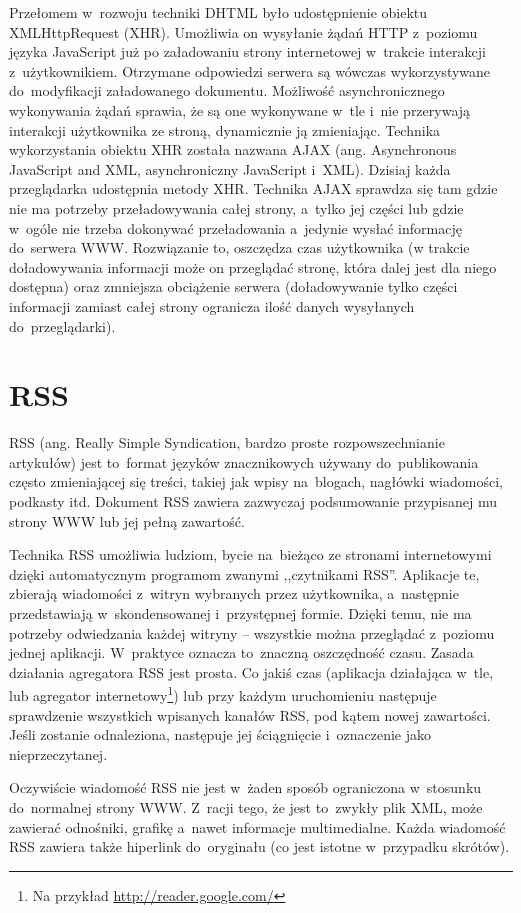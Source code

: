 \documentclass[a4paper,12pt,oneside]{report}
\begin{document}
Przełomem w~rozwoju techniki DHTML było udostępnienie obiektu XMLHttpRequest (XHR). Umożliwia on wysyłanie żądań HTTP z~poziomu języka JavaScript już po załadowaniu strony internetowej w~trakcie interakcji z~użytkownikiem. Otrzymane odpowiedzi serwera są wówczas wykorzystywane do~modyfikacji załadowanego dokumentu. Możliwość asynchronicznego wykonywania żądań sprawia, że są one wykonywane w~tle i~nie przerywają interakcji użytkownika ze stroną, dynamicznie ją zmieniając. Technika wykorzystania obiektu XHR została nazwana AJAX (ang. Asynchronous JavaScript and XML, asynchroniczny JavaScript i~XML). Dzisiaj każda przeglądarka udostępnia metody XHR. Technika AJAX sprawdza się tam gdzie nie ma potrzeby przeładowywania całej strony, a~tylko jej części lub gdzie w~ogóle nie trzeba dokonywać przeładowania a~jedynie wysłać informację do~serwera WWW. Rozwiązanie to, oszczędza czas użytkownika (w trakcie doładowywania informacji może on przeglądać stronę, która dalej jest dla niego dostępna) oraz zmniejsza obciążenie serwera (doładowywanie tylko części informacji zamiast całej strony ogranicza ilość danych wysyłanych do~przeglądarki). 

\section{RSS}
\label{sec:rss}
RSS (ang. Really Simple Syndication, bardzo proste rozpowszechnianie artykułów) jest to~format języków znacznikowych używany do~publikowania często zmieniającej się treści, takiej jak wpisy na~blogach, nagłówki wiadomości, podkasty itd. Dokument RSS zawiera zazwyczaj podsumowanie przypisanej mu strony WWW lub jej pełną zawartość. 

Technika RSS umożliwia ludziom, bycie na~bieżąco ze stronami internetowymi dzięki automatycznym programom zwanymi ,,czytnikami RSS''. Aplikacje te, zbierają wiadomości z~witryn wybranych przez użytkownika, a~następnie przedstawiają w~skondensowanej i~przystępnej formie. Dzięki temu, nie ma potrzeby odwiedzania każdej witryny -- wszystkie można przeglądać z~poziomu jednej aplikacji. W~praktyce oznacza to~znaczną oszczędność czasu. Zasada działania agregatora RSS jest prosta. Co jakiś czas (aplikacja działająca w~tle, lub agregator internetowy\footnote{Na przykład \url{http://reader.google.com/}}) lub przy każdym uruchomieniu następuje sprawdzenie wszystkich wpisanych kanałów RSS, pod kątem nowej zawartości. Jeśli zostanie odnaleziona, następuje jej ściągnięcie i~oznaczenie jako nieprzeczytanej. 

Oczywiście wiadomość RSS nie jest w~żaden sposób ograniczona w~stosunku do~normalnej strony WWW. Z~racji tego, że jest to~zwykły plik XML, może zawierać odnośniki, grafikę a~nawet informacje multimedialne. Każda wiadomość RSS zawiera także hiperlink do~oryginału (co jest istotne w~przypadku skrótów). 
\end{document}
